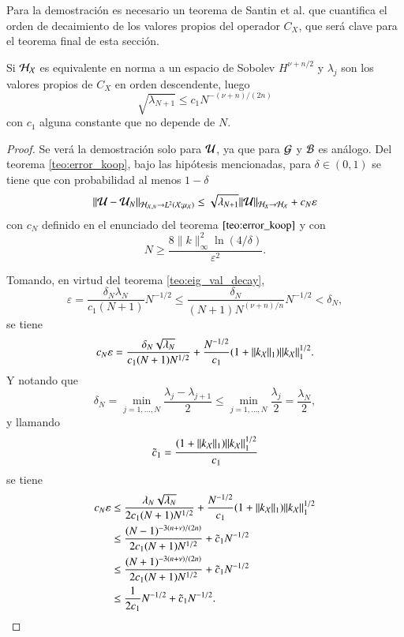 Para la demostración es necesario un teorema de Santin et al. que cuantifica el orden de decaimiento de los valores propios del operador $C_X$, que será clave para el teorema final de esta sección.

\begin{teo}
    Si $\mathcal{H}_{\mathcal{X}}$ es equivalente en norma a un espacio de Sobolev $H^{\nu + n/2}$ y $\lambda_j$ son los valores propios de $C_X$ en orden descendente, luego
    \begin{equation*}
        \sqrt{\lambda_{N+1}} \leq c_1 N^{-(\nu + n)/(2n)}
    \end{equation*}
    con $c_1$ alguna constante que no depende de $N$.
    \label{teo:eig_val_decay}
\end{teo}

\begin{proof}
    Se verá la demostración solo para $\mathcal{U}$, ya que para $\mathcal{G}$ y $\mathcal{B}$ es análogo. Del teorema \ref{teo:error_koop}, bajo las hipótesis mencionadas, para $\delta \in (0, 1)$ se tiene que con probabilidad al menos $1-\delta$
    \[
    \|\mathcal{U} - \mathcal{U}_N \|_{\mathcal{H}_{\mathcal{X}, N} \to L^2(\mathcal{X}; \mu_{\mathcal{X}})} \leq \sqrt{\lambda_{N+1}} \|\mathcal{U} \|_{\mathcal{H}_{X} \to \mathcal{H_{\mathcal{X}}}} + c_N \varepsilon
    \]
    con $c_N$ definido en el enunciado del teorema $\ref{teo:error_koop}$ y con 
    \begin{equation}
        N \geq \frac{8\|k\|^2_\infty \ln(4/\delta)}{\varepsilon^2}.
        \label{eq:N_bound}
    \end{equation}

    Tomando, en virtud del teorema \ref{teo:eig_val_decay}, 
    \[
    \varepsilon = \frac{\delta_N \lambda_N}{c_1(N+1)} N^{-1/2} \leq \frac{\delta_N}{(N+1)N^{(\nu+n)/n}} N^{-1/2} <\delta_N,
    \]
    se tiene
    \[
    c_N \varepsilon = \frac{\delta_N \sqrt{\lambda_N}}{c_1 (N+1) N^{1/2}} + \frac{N^{-1/2}}{c_1} (1 + \|k_{\mathcal{X}}\|_{1}) \|k_{\mathcal{X}} \|^{1/2}_{1}.
    \]
    Y notando que 
    \[
    \delta_N = \min_{j=1, \dots, N} \frac{\lambda_j - \lambda_{j+1}}{2} \leq \min_{j=1, \dots, N} \frac{\lambda_j}{2} = \frac{\lambda_N}{2},
    \]
    y llamando
    \[
    \Tilde{c}_1 = \frac{(1 + \|k_{\mathcal{X}}\|_{1}) \|k_{\mathcal{X}} \|^{1/2}_{1}}{c_1}
    \]
    se tiene
    \[
    \begin{aligned}
        c_N \varepsilon & \leq  \frac{\lambda_N \sqrt{\lambda_N}}{2 c_1 (N+1) N^{1/2}} + \frac{N^{-1/2}}{c_1} (1 + \|k_{\mathcal{X}}\|_{1}) \|k_{\mathcal{X}} \|^{1/2}_{1} \\ 
        & \leq \frac{(N-1)^{-3(n+\nu)/(2n)}}{2 c_1 (N+1) N^{1/2}} + \Tilde{c}_1 N^{-1/2} \\
        & \leq \frac{(N+1)^{-3(n+\nu)/(2n)}}{2 c_1 (N+1) N^{1/2}} + \Tilde{c}_1 N^{-1/2} \\
        & \leq \frac{1}{2c_1} N^{-1/2} + \Tilde{c}_1 N^{-1/2}.
    \end{aligned}
    \]
    

\end{proof}
